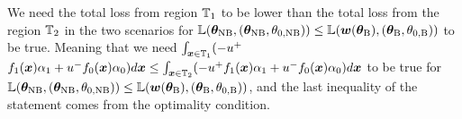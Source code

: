 We need the total loss from region ${\mathbb{T}}_1$ to be lower than the total loss from the region ${\mathbb{T}}_2$ in the two scenarios for ${\mathbb{L}}({\bm{\theta}}_\text{NB}, ({\bm{\theta}}_\text{NB}, \theta_{0, \text{NB}}))\le {\mathbb{L}}({\bm{w}}({\bm{\theta}}_\text{B}), ({\bm{\theta}}_\text{B}, \theta_{0, \text{B}}))$ to be true. Meaning that we need $\int_{{\bm{x}}\in{\mathbb{T}}_1}(-u^+$ $f_1({\bm{x}})\alpha_1+u^-f_0({\bm{x}})\alpha_0)d{\bm{x}} \le \int_{{\bm{x}}\in{\mathbb{T}}_2}(-u^+f_1({\bm{x}})\alpha_1+u^-f_0({\bm{x}})\alpha_0)d{\bm{x}}$ to be true for ${\mathbb{L}}({\bm{\theta}}_\text{NB}, ({\bm{\theta}}_\text{NB}, \theta_{0, \text{NB}}))\le {\mathbb{L}}({\bm{w}}({\bm{\theta}}_\text{B}), ({\bm{\theta}}_\text{B}, \theta_{0, \text{B}}))$, and the last inequality of the statement comes from the optimality condition. 